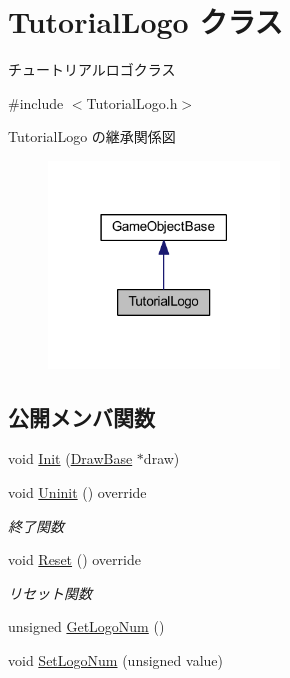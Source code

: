 \hypertarget{class_tutorial_logo}{}\section{Tutorial\+Logo クラス}
\label{class_tutorial_logo}


チュートリアルロゴクラス  




{\ttfamily \#include $<$Tutorial\+Logo.\+h$>$}



Tutorial\+Logo の継承関係図\nopagebreak
\begin{figure}[H]
\begin{center}
\leavevmode
\includegraphics[width=174pt]{class_tutorial_logo__inherit__graph}
\end{center}
\end{figure}
\subsection*{公開メンバ関数}
\begin{DoxyCompactItemize}
\item 
void \mbox{\hyperlink{class_tutorial_logo_a590f017a6b0532d08c1377b90b8fba3f}{Init}} (\mbox{\hyperlink{class_draw_base}{Draw\+Base}} $\ast$draw)
\item 
void \mbox{\hyperlink{class_tutorial_logo_a8e1f1dba47dadf7d1bb40f616324ffb5}{Uninit}} () override
\begin{DoxyCompactList}\small\item\em 終了関数 \end{DoxyCompactList}\item 
void \mbox{\hyperlink{class_tutorial_logo_a2c9e22c81cfeafbd34f50cc766a66cf1}{Reset}} () override
\begin{DoxyCompactList}\small\item\em リセット関数 \end{DoxyCompactList}\item 
unsigned \mbox{\hyperlink{class_tutorial_logo_af4735bb34e06803ff13ae227fcf74e09}{Get\+Logo\+Num}} ()
\item 
void \mbox{\hyperlink{class_tutorial_logo_a18313074bc7242f5e8a9121414abd51d}{Set\+Logo\+Num}} (unsigned value)
\end{DoxyCompactItemize}
